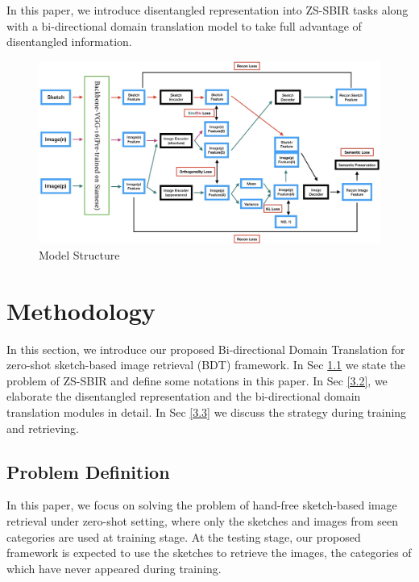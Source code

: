 \documentclass[10pt,twocolumn,letterpaper]{article}
\begin{document}
In this paper, we introduce disentangled representation into ZS-SBIR tasks along with a bi-directional domain translation model to take full advantage of disentangled information.


\begin{figure}
\begin{center}
\includegraphics[width=0.95\linewidth]{model_structure.jpg}
\end{center}
   \caption{Model Structure}
\label{fig:structure}
\end{figure}

\section{Methodology}
In this section, we introduce our proposed Bi-directional Domain Translation for zero-shot sketch-based image retrieval (BDT) framework. In Sec \ref{3.1} we state the problem of ZS-SBIR and define some notations in this paper. In Sec \ref{3.2}, we elaborate the disentangled representation and the bi-directional domain translation modules in detail. In Sec \ref{3.3} we discuss the strategy during training and retrieving.

\subsection{Problem Definition} \label{3.1}
In this paper, we focus on solving the problem of hand-free sketch-based image retrieval under zero-shot setting, where only the sketches and images from seen categories are used at training stage. 
At the testing stage, our proposed framework is expected to use the sketches to retrieve the images, the categories of which have never appeared during training.
\end{document}
